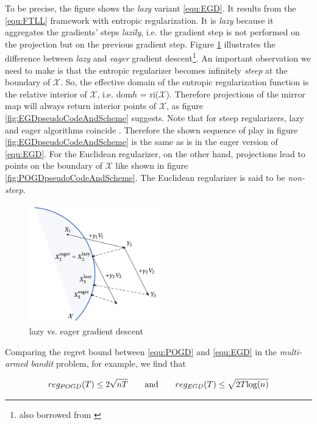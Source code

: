 To be precise, the figure shows the \textit{lazy} variant \ref{equ:EGD}. It results from the \ref{equ:FTLL} framework with entropic regularization. It is \textit{lazy} because it aggregates the gradients' steps \textit{lazily}, i.e. the gradient step is not performed on the projection but on the previous gradient step. Figure \ref{fig:LazyVsEager} illustrates the difference between \textit{lazy} and \textit{eager} gradient descent\footnote{also borrowed from \cite[Chapter 2]{HDRmertikopoulos}}. An important observation we need to make is that the entropic regularizer becomes infinitely \textit{steep} at the boundary of $\mathcal{X}$. So, the effective domain of the entropic regularization function is the relative interior of $\mathcal{X}$, i.e. dom$h$ = ri($\mathcal{X}$). Therefore projections of the mirror map will always return interior points of $\mathcal{X}$, as figure \ref{fig:EGDpseudoCodeAndScheme} suggests. Note that for steep regularizers, lazy and eager algorithms coincide \cite{HDRmertikopoulos}. Therefore the shown sequence of play in figure \ref{fig:EGDpseudoCodeAndScheme} is the same as is in the eager version of \ref{equ:EGD}. For the Euclidean regularizer, on the other hand, projections lead to points on the boundary of $\mathcal{X}$ like shown in figure \ref{fig:POGDpseudoCodeAndScheme}. The Euclidean regularizer is said to be \textit{non-steep}. \\

\begin{figure}[t]
\centering
  \includegraphics[width=0.5\textwidth]{logos/LazyVsEager.png}
\caption{lazy vs. eager gradient descent}
\label{fig:LazyVsEager}
\end{figure}

Comparing the regret bound between \ref{equ:POGD} and \ref{equ:EGD} in the \textit{multi-armed bandit} problem, for example, we find that \cite{HDRmertikopoulos}

\begin{equation*}
    reg_{POGD}(T) \le 2\sqrt{nT} \qquad \textnormal{and} \qquad reg_{EGD}(T) \le \sqrt{2T\textnormal{log}(n)}
\end{equation*}

